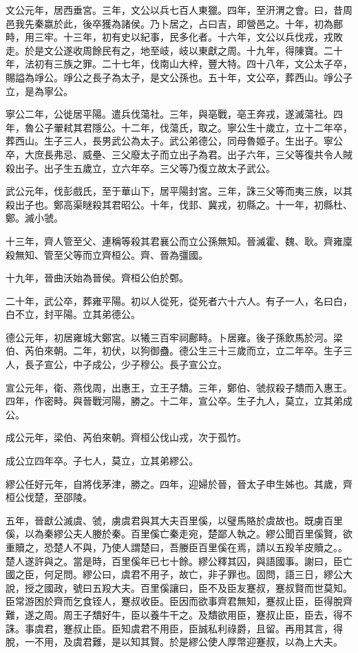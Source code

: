 文公元年，居西垂宮。三年，文公以兵七百人東獵。四年，至汧渭之會。曰，昔周邑我先秦嬴於此，後卒獲為諸侯。乃卜居之，占曰吉，即營邑之。十年，初為鄜畤，用三牢。十三年，初有史以紀事，民多化者。十六年，文公以兵伐戎，戎敗走。於是文公遂收周餘民有之，地至岐，岐以東獻之周。十九年，得陳寶。二十年，法初有三族之罪。二十七年，伐南山大梓，豐大特。四十八年，文公太子卒，賜謚為竫公。竫公之長子為太子，是文公孫也。五十年，文公卒，葬西山。竫公子立，是為寧公。

寧公二年，公徙居平陽。遣兵伐蕩社。三年，與亳戰，亳王奔戎，遂滅蕩社。四年，魯公子翬弒其君隱公。十二年，伐蕩氏，取之。寧公生十歲立，立十二年卒，葬西山。生子三人，長男武公為太子。武公弟德公，同母魯姬子。生出子。寧公卒，大庶長弗忌、威壘、三父廢太子而立出子為君。出子六年，三父等復共令人賊殺出子。出子生五歲立，立六年卒。三父等乃復立故太子武公。

武公元年，伐彭戲氏，至于華山下，居平陽封宮。三年，誅三父等而夷三族，以其殺出子也。鄭高渠瞇殺其君昭公。十年，伐邽、冀戎，初縣之。十一年，初縣杜、鄭。滅小虢。

十三年，齊人管至父、連稱等殺其君襄公而立公孫無知。晉滅霍、魏、耿。齊雍廩殺無知、管至父等而立齊桓公。齊、晉為彊國。

十九年，晉曲沃始為晉侯。齊桓公伯於鄄。

二十年，武公卒，葬雍平陽。初以人從死，從死者六十六人。有子一人，名曰白，白不立，封平陽。立其弟德公。

德公元年，初居雍城大鄭宮。以犧三百牢祠鄜畤。卜居雍。後子孫飲馬於河。梁伯、芮伯來朝。二年，初伏，以狗御蠱。德公生三十三歲而立，立二年卒。生子三人，長子宣公，中子成公，少子穆公。長子宣公立。

宣公元年，衛、燕伐周，出惠王，立王子穨。三年，鄭伯、虢叔殺子穨而入惠王。四年，作密畤。與晉戰河陽，勝之。十二年，宣公卒。生子九人，莫立，立其弟成公。

成公元年，梁伯、芮伯來朝。齊桓公伐山戎，次于孤竹。

成公立四年卒。子七人，莫立，立其弟繆公。

繆公任好元年，自將伐茅津，勝之。四年，迎婦於晉，晉太子申生姊也。其歲，齊桓公伐楚，至邵陵。

五年，晉獻公滅虞、虢，虜虞君與其大夫百里傒，以璧馬賂於虞故也。既虜百里傒，以為秦繆公夫人媵於秦。百里傒亡秦走宛，楚鄙人執之。繆公聞百里傒賢，欲重贖之，恐楚人不與，乃使人謂楚曰，吾媵臣百里傒在焉，請以五羖羊皮贖之。。楚人遂許與之。當是時，百里傒年已七十餘。繆公釋其囚，與語國事。謝曰，臣亡國之臣，何足問。繆公曰，虞君不用子，故亡，非子罪也。固問，語三日，繆公大說，授之國政，號曰五羖大夫。百里傒讓曰，臣不及臣友蹇叔，蹇叔賢而世莫知。臣常游困於齊而乞食铚人，蹇叔收臣。臣因而欲事齊君無知，蹇叔止臣，臣得脫齊難，遂之周。周王子穨好牛，臣以養牛干之。及穨欲用臣，蹇叔止臣，臣去，得不誅。事虞君，蹇叔止臣。臣知虞君不用臣，臣誠私利祿爵，且留。再用其言，得脫，一不用，及虞君難，是以知其賢。於是繆公使人厚幣迎蹇叔，以為上大夫。

